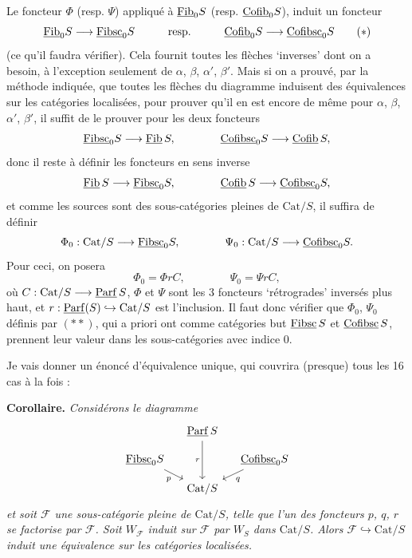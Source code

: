 Le foncteur $\Phi$ (resp. $\Psi$) appliqué à $\underline{\mathrm{Fib}}_0S$ (resp. $\underline{\mathrm{Cofib}}_0S$), induit un foncteur
\[
\underline{\mathrm{Fib}}_0S \longrightarrow \underline{\mathrm{Fibsc}}_0S \qquad\quad \text{resp.} \qquad\quad \underline{\mathrm{Cofib}}_0S \longrightarrow \underline{\mathrm{Cofibsc}}_0S \tag*{$(*)$}
\]
(ce qu'il faudra vérifier). Cela fournit toutes les flèches `inverses' dont on a besoin, à l'exception seulement de $\alpha$, $\beta$, $\alpha'$, $\beta'$. Mais si on a prouvé, par la méthode indiquée, que toutes les flèches du diagramme induisent des équivalences sur les catégories localisées, pour prouver qu'il en est encore de même pour $\alpha$, $\beta$, $\alpha'$, $\beta'$, il suffit de le prouver pour les deux foncteurs
\[
\underline{\mathrm{Fibsc}}_0S \longrightarrow \underline{\mathrm{Fib}}\,S, \qquad\qquad \underline{\mathrm{Cofibsc}}_0S \longrightarrow \underline{\mathrm{Cofib}}\,S,
\]
donc il reste à définir les foncteurs en sens inverse
\[
\underline{\mathrm{Fib}}\,S \longrightarrow \underline{\mathrm{Fibsc}}_0S, \qquad\qquad \underline{\mathrm{Cofib}}\,S \longrightarrow \underline{\mathrm{Cofibsc}}_0S,
\]
et comme les sources sont des sous-catégories pleines de $\mathrm{Cat}/S$, il suffira de définir
\[
\Phi_0 : \mathrm{Cat}/S \longrightarrow \underline{\mathrm{Fibsc}}_0S, \qquad\qquad \Psi_0 : \mathrm{Cat}/S \longrightarrow \underline{\mathrm{Cofibsc}}_0S.
\]
Pour ceci, on posera
\[
\Phi_0 = \Phi r C, \qquad\qquad \Psi_0 = \Psi r C, \tag*{$(**)$}
\]
où $C : \mathrm{Cat}/S \longrightarrow \underline{\mathrm{Parf}}\,S$, $\Phi$ et $\Psi$ sont les 3 foncteurs `rétrogrades' inversés plus haut, et $r : \underline{\mathrm{Parf}}(S) \hookrightarrow \mathrm{Cat}/S$ est l'inclusion. Il faut donc vérifier que $\Phi_0$, $\Psi_0$ définis par $(**)$, qui a priori ont comme catégories but $\underline{\mathrm{Fibsc}}\,S$ et $\underline{\mathrm{Cofibsc}}\,S$, prennent leur valeur dans les sous-catégories avec indice 0.

Je vais donner un énoncé d'équivalence unique, qui couvrira (presque) tous les 16 cas à la fois :

\textbf{Corollaire.} \textit{Considérons le diagramme}
\[
\begin{tikzcd}[column sep=small, row sep=small]
 & \ul{Parf}\,S \arrow[dd, "r"'] & \\
\ul{Fibsc}_0S \arrow[dr, "p"'] & & \ul{Cofibsc}_0S \arrow[dl, "q"] \\
 & \mathrm{Cat}/S &
\end{tikzcd}
\]
\textit{et soit $\mathcal{F}$ une sous-catégorie pleine de $\mathrm{Cat}/S$, telle que l'un des foncteurs $p$, $q$, $r$ se factorise par $\mathcal{F}$. Soit $W_{\mathcal{F}}$ induit sur $\mathcal{F}$ par $W_S$ dans $\mathrm{Cat}/S$. Alors $\mathcal{F} \hookrightarrow \mathrm{Cat}/S$ induit une équivalence sur les catégories localisées.}

